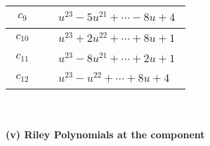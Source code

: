 \documentclass[1p]{elsarticle_modified}
\theoremstyle{definition}
\begin{document}
\begin{tabular}{m{50pt}|m{274pt}}
\hline $$\begin{aligned}c_{9}\end{aligned}$$&$\begin{aligned}
&u^{23}-5 u^{21}+\cdots-8 u+4
\end{aligned}$\\
\hline $$\begin{aligned}c_{10}\end{aligned}$$&$\begin{aligned}
&u^{23}+2 u^{22}+\cdots+8 u+1
\end{aligned}$\\
\hline $$\begin{aligned}c_{11}\end{aligned}$$&$\begin{aligned}
&u^{23}-8 u^{21}+\cdots+2 u+1
\end{aligned}$\\
\hline $$\begin{aligned}c_{12}\end{aligned}$$&$\begin{aligned}
&u^{23}- u^{22}+\cdots+8 u+4
\end{aligned}$\\
\hline
\end{tabular}\\~\\
\newpage\renewcommand{\arraystretch}{1}
\flushleft \textbf{(v) Riley Polynomials at the component}\newline \\
\end{document}
